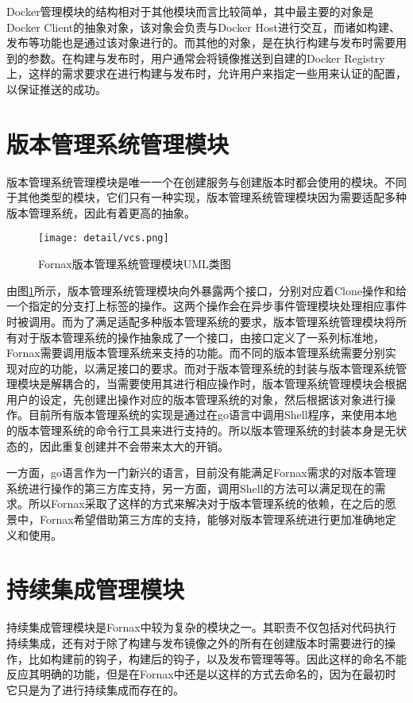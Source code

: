 Docker管理模块的结构相对于其他模块而言比较简单，其中最主要的对象是Docker Client的抽象对象，该对象会负责与Docker Host进行交互，而诸如构建、发布等功能也是通过该对象进行的。而其他的对象，是在执行构建与发布时需要用到的参数。在构建与发布时，用户通常会将镜像推送到自建的Docker Registry上，这样的需求要求在进行构建与发布时，允许用户来指定一些用来认证的配置，以保证推送的成功。

\section{版本管理系统管理模块}

版本管理系统管理模块是唯一一个在创建服务与创建版本时都会使用的模块。不同于其他类型的模块，它们只有一种实现，版本管理系统管理模块因为需要适配多种版本管理系统，因此有着更高的抽象。

\begin{figure}[!htp]
  \centering
  \texttt{[image: detail/vcs.png]}
  \caption{Fornax版本管理系统管理模块UML类图}
  \label{fig:vcs}
\end{figure}

由图\ref{fig:vcs}所示，版本管理系统管理模块向外暴露两个接口，分别对应着Clone操作和给一个指定的分支打上标签的操作。这两个操作会在异步事件管理模块处理相应事件时被调用。而为了满足适配多种版本管理系统的要求，版本管理系统管理模块将所有对于版本管理系统的操作抽象成了一个接口，由接口定义了一系列标准地，Fornax需要调用版本管理系统来支持的功能。而不同的版本管理系统需要分别实现对应的功能，以满足接口的要求。而对于版本管理系统的封装与版本管理系统管理模块是解耦合的，当需要使用其进行相应操作时，版本管理系统管理模块会根据用户的设定，先创建出操作对应的版本管理系统的对象，然后根据该对象进行操作。目前所有版本管理系统的实现是通过在go语言中调用Shell程序，来使用本地的版本管理系统的命令行工具来进行支持的。所以版本管理系统的封装本身是无状态的，因此重复创建并不会带来太大的开销。

一方面，go语言作为一门新兴的语言，目前没有能满足Fornax需求的对版本管理系统进行操作的第三方库支持，另一方面，调用Shell的方法可以满足现在的需求。所以Fornax采取了这样的方式来解决对于版本管理系统的依赖，在之后的愿景中，Fornax希望借助第三方库的支持，能够对版本管理系统进行更加准确地定义和使用。

\section{持续集成管理模块}

持续集成管理模块是Fornax中较为复杂的模块之一。其职责不仅包括对代码执行持续集成，还有对于除了构建与发布镜像之外的所有在创建版本时需要进行的操作，比如构建前的钩子，构建后的钩子，以及发布管理等等。因此这样的命名不能反应其明确的功能，但是在Fornax中还是以这样的方式去命名的，因为在最初时它只是为了进行持续集成而存在的。

